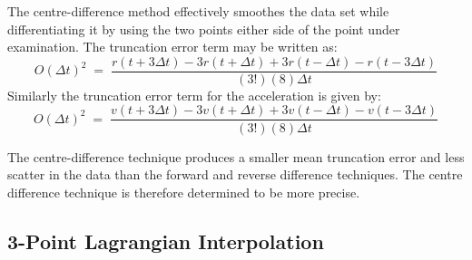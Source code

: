 \documentclass[namedreferences]{SolarPhysics}
\begin{document}
\begin{article}

The centre-difference method effectively smoothes the data set while differentiating it by using the two points either side of the point under examination. The truncation error term may be written as:
\begin{equation}
O(\Delta t)^{2} \; = \; \frac{r(t + 3\Delta t) - 3r(t + \Delta t) + 3r(t - \Delta t) - r(t - 3\Delta t)}{(3!)(8)\Delta t}
\end{equation}
Similarly the truncation error term for the acceleration is given by:
\begin{equation}
O(\Delta t)^{2} \; = \; \frac{v(t + 3\Delta t) - 3v(t + \Delta t) + 3v(t - \Delta t) - v(t - 3\Delta t)}{(3!)(8)\Delta t}
\end{equation}
 
The centre-difference technique produces a smaller mean truncation error and less scatter in the data than the forward and reverse difference techniques. The centre difference technique is therefore determined to be more precise.


\subsection{3-Point Lagrangian Interpolation}
\label{sect_lagrangian}


\end{article}
\end{document}
